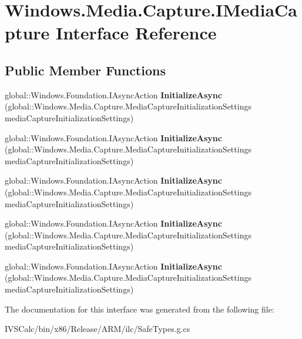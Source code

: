 \hypertarget{interface_windows_1_1_media_1_1_capture_1_1_i_media_capture}{}\section{Windows.\+Media.\+Capture.\+I\+Media\+Capture Interface Reference}
\label{interface_windows_1_1_media_1_1_capture_1_1_i_media_capture}
\subsection*{Public Member Functions}
\begin{DoxyCompactItemize}
\item 
\mbox{\label{interface_windows_1_1_media_1_1_capture_1_1_i_media_capture_afbda870ba36f96306621c81d6259a1b3}} 
global\+::\+Windows.\+Foundation.\+I\+Async\+Action {\bfseries Initialize\+Async} (global\+::\+Windows.\+Media.\+Capture.\+Media\+Capture\+Initialization\+Settings media\+Capture\+Initialization\+Settings)
\item 
\mbox{\label{interface_windows_1_1_media_1_1_capture_1_1_i_media_capture_afbda870ba36f96306621c81d6259a1b3}} 
global\+::\+Windows.\+Foundation.\+I\+Async\+Action {\bfseries Initialize\+Async} (global\+::\+Windows.\+Media.\+Capture.\+Media\+Capture\+Initialization\+Settings media\+Capture\+Initialization\+Settings)
\item 
\mbox{\label{interface_windows_1_1_media_1_1_capture_1_1_i_media_capture_afbda870ba36f96306621c81d6259a1b3}} 
global\+::\+Windows.\+Foundation.\+I\+Async\+Action {\bfseries Initialize\+Async} (global\+::\+Windows.\+Media.\+Capture.\+Media\+Capture\+Initialization\+Settings media\+Capture\+Initialization\+Settings)
\item 
\mbox{\label{interface_windows_1_1_media_1_1_capture_1_1_i_media_capture_afbda870ba36f96306621c81d6259a1b3}} 
global\+::\+Windows.\+Foundation.\+I\+Async\+Action {\bfseries Initialize\+Async} (global\+::\+Windows.\+Media.\+Capture.\+Media\+Capture\+Initialization\+Settings media\+Capture\+Initialization\+Settings)
\item 
\mbox{\label{interface_windows_1_1_media_1_1_capture_1_1_i_media_capture_afbda870ba36f96306621c81d6259a1b3}} 
global\+::\+Windows.\+Foundation.\+I\+Async\+Action {\bfseries Initialize\+Async} (global\+::\+Windows.\+Media.\+Capture.\+Media\+Capture\+Initialization\+Settings media\+Capture\+Initialization\+Settings)
\end{DoxyCompactItemize}


The documentation for this interface was generated from the following file\+:\begin{DoxyCompactItemize}
\item 
I\+V\+S\+Calc/bin/x86/\+Release/\+A\+R\+M/ilc/Safe\+Types.\+g.\+cs\end{DoxyCompactItemize}
